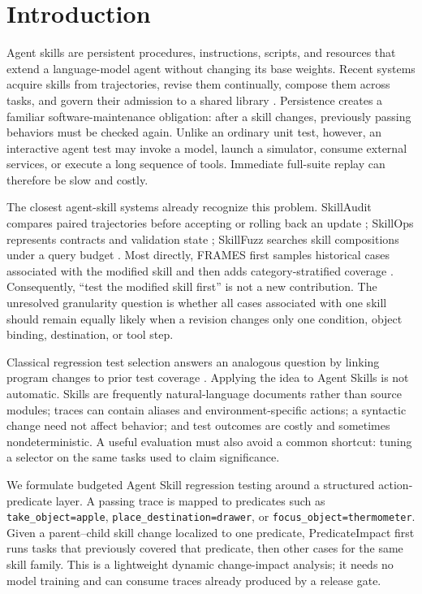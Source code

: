 \documentclass[10pt]{article}
\begin{document}
\section{Introduction}
Agent skills are persistent procedures, instructions, scripts, and resources that extend a language-model agent without changing its base weights. Recent systems acquire skills from trajectories, revise them continually, compose them across tasks, and govern their admission to a shared library \citep{ye2026mce,lei2026skillevolbench,gao2026skillaudit,song2026skillops}. Persistence creates a familiar software-maintenance obligation: after a skill changes, previously passing behaviors must be checked again. Unlike an ordinary unit test, however, an interactive agent test may invoke a model, launch a simulator, consume external services, or execute a long sequence of tools. Immediate full-suite replay can therefore be slow and costly.

The closest agent-skill systems already recognize this problem. SkillAudit compares paired trajectories before accepting or rolling back an update \citep{gao2026skillaudit}; SkillOps represents contracts and validation state \citep{song2026skillops}; SkillFuzz searches skill compositions under a query budget \citep{hu2026skillfuzz}. Most directly, FRAMES first samples historical cases associated with the modified skill and then adds category-stratified coverage \citep{wang2026frames}. Consequently, ``test the modified skill first'' is not a new contribution. The unresolved granularity question is whether all cases associated with one skill should remain equally likely when a revision changes only one condition, object binding, destination, or tool step.

Classical regression test selection answers an analogous question by linking program changes to prior test coverage \citep{rothermel1996rts}. Applying the idea to Agent Skills is not automatic. Skills are frequently natural-language documents rather than source modules; traces can contain aliases and environment-specific actions; a syntactic change need not affect behavior; and test outcomes are costly and sometimes nondeterministic. A useful evaluation must also avoid a common shortcut: tuning a selector on the same tasks used to claim significance.

We formulate budgeted Agent Skill regression testing around a structured action-predicate layer. A passing trace is mapped to predicates such as \texttt{take\_object=apple}, \texttt{place\_destination=drawer}, or \texttt{focus\_object=thermometer}. Given a parent--child skill change localized to one predicate, PredicateImpact first runs tasks that previously covered that predicate, then other cases for the same skill family. This is a lightweight dynamic change-impact analysis; it needs no model training and can consume traces already produced by a release gate.
\end{document}

